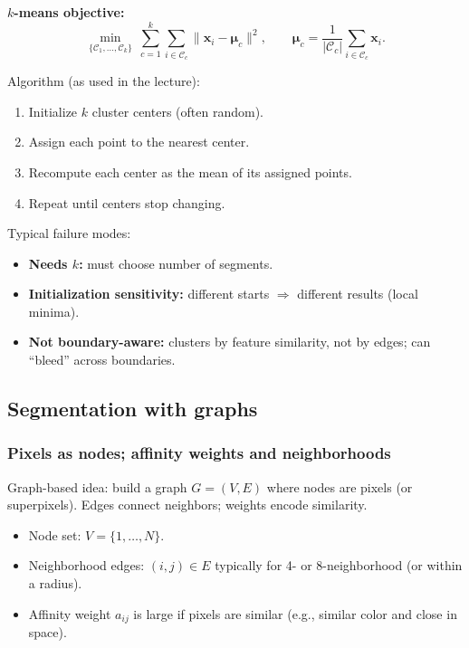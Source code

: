 \documentclass[11pt,a4paper]{article}
\newcommand{\vct}[1]{\bm{#1}}
\begin{document}
\begin{mathrule}
\textbf{$k$-means objective:}\quad
\[
\min_{\{\mathcal{C}_1,\dots,\mathcal{C}_k\}} \ \sum_{c=1}^k \sum_{i\in\mathcal{C}_c} \|\vct{x}_i - \vct{\mu}_c\|^2,
\qquad
\vct{\mu}_c = \frac{1}{|\mathcal{C}_c|}\sum_{i\in\mathcal{C}_c}\vct{x}_i.
\]
\end{mathrule}

Algorithm (as used in the lecture):
\begin{enumerate}
  \item Initialize $k$ cluster centers (often random).
  \item Assign each point to the nearest center.
  \item Recompute each center as the mean of its assigned points.
  \item Repeat until centers stop changing.
\end{enumerate}

Typical failure modes:
\begin{itemize}
  \item \textbf{Needs $k$:} must choose number of segments.
  \item \textbf{Initialization sensitivity:} different starts $\Rightarrow$ different results (local minima).
  \item \textbf{Not boundary-aware:} clusters by feature similarity, not by edges; can ``bleed'' across boundaries.
\end{itemize}


\subsection{Segmentation with graphs}

\subsubsection{Pixels as nodes; affinity weights and neighborhoods}
\begin{defbox}
Graph-based idea: build a graph $G=(V,E)$ where nodes are pixels (or superpixels).
Edges connect neighbors; weights encode similarity.
\end{defbox}

\begin{itemize}
  \item Node set: $V=\{1,\dots,N\}$.
  \item Neighborhood edges: $(i,j)\in E$ typically for 4- or 8-neighborhood (or within a radius).
  \item Affinity weight $a_{ij}$ is large if pixels are similar (e.g., similar color and close in space).
\end{itemize}
\end{document}
